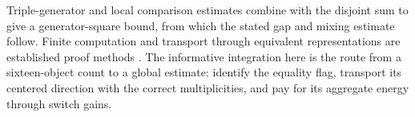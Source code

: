 Triple-generator and local comparison estimates combine with the
disjoint sum to give a generator-square bound, from which the stated gap
and mixing estimate follow. Finite computation and transport through
equivalent representations are established proof methods
\citep{Harrison1995,CohenMahboubi2012}. The informative integration here
is the route from a sixteen-object count to a global estimate: identify
the equality flag, transport its centered direction with the correct
multiplicities, and pay for its aggregate energy through switch gains.
